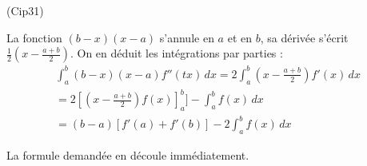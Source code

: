 \begin{tiny}(Cip31)\end{tiny} La fonction $(b-x)(x-a)$ s'annule en $a$ et en $b$, sa dérivée s'écrit $\frac{1}{2}(x-\frac{a+b}{2})$. On en déduit les intégrations par parties :
\begin{multline*}
\int_{a}^{b}(b-x)(x-a)f''(tx)\,dx = 2\int_{a}^{b}(x-\frac{a+b}{2})f'(x)\,dx\\
 = 2[(x-\frac{a+b}{2})f(x)]_{a}^{b}]-\int_{a}^{b}f(x)\,dx\\
 = (b-a)[f'(a)+f'(b)]-2\int_{a}^{b}f(x)\,dx
\end{multline*}

La formule demandée en découle immédiatement.
